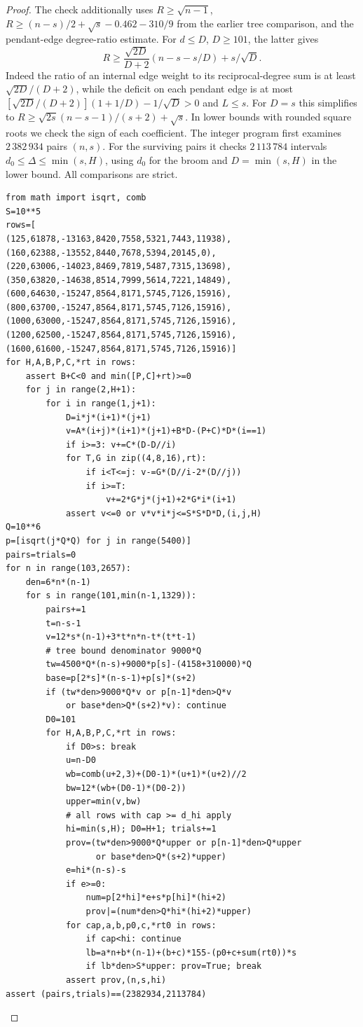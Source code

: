 \documentclass[11pt,a4paper]{article}
\begin{document}
\begin{proof}
The check additionally uses $R\ge\sqrt{n-1}$,
$R\ge(n-s)/2+\sqrt{s}-0.462-310/9$ from the earlier tree comparison,
and the pendant-edge degree-ratio estimate. For $d\le D$, $D\ge101$,
the latter gives
\[
 R\ge\frac{\sqrt{2D}}{D+2}(n-s-s/D)+s/\sqrt D .
\]
Indeed the ratio of an internal edge weight to its reciprocal-degree
sum is at least $\sqrt{2D}/(D+2)$, while the deficit on each pendant
edge is at most $[\sqrt{2D}/(D+2)](1+1/D)-1/\sqrt D>0$ and $L\le s$.
For $D=s$ this simplifies to $R\ge\sqrt{2s}(n-s-1)/(s+2)+\sqrt{s}$.
In lower bounds with rounded square roots we check the sign of each
coefficient. The integer program first examines $2\,382\,934$ pairs
$(n,s)$. For the surviving pairs it checks $2\,113\,784$ intervals
$d_0\le\Delta\le\min(s,H)$, using $d_0$ for the broom and
$D=\min(s,H)$ in the lower bound. All comparisons are strict.
\begin{verbatim}
from math import isqrt, comb
S=10**5
rows=[
(125,61878,-13163,8420,7558,5321,7443,11938),
(160,62388,-13552,8440,7678,5394,20145,0),
(220,63006,-14023,8469,7819,5487,7315,13698),
(350,63820,-14638,8514,7999,5614,7221,14849),
(600,64630,-15247,8564,8171,5745,7126,15916),
(800,63700,-15247,8564,8171,5745,7126,15916),
(1000,63000,-15247,8564,8171,5745,7126,15916),
(1200,62500,-15247,8564,8171,5745,7126,15916),
(1600,61600,-15247,8564,8171,5745,7126,15916)]
for H,A,B,P,C,*rt in rows:
    assert B+C<0 and min([P,C]+rt)>=0
    for j in range(2,H+1):
        for i in range(1,j+1):
            D=i*j*(i+1)*(j+1)
            v=A*(i+j)*(i+1)*(j+1)+B*D-(P+C)*D*(i==1)
            if i>=3: v+=C*(D-D//i)
            for T,G in zip((4,8,16),rt):
                if i<T<=j: v-=G*(D//i-2*(D//j))
                if i>=T:
                    v+=2*G*j*(j+1)+2*G*i*(i+1)
            assert v<=0 or v*v*i*j<=S*S*D*D,(i,j,H)
Q=10**6
p=[isqrt(j*Q*Q) for j in range(5400)]
pairs=trials=0
for n in range(103,2657):
    den=6*n*(n-1)
    for s in range(101,min(n-1,1329)):
        pairs+=1
        t=n-s-1
        v=12*s*(n-1)+3*t*n*n-t*(t*t-1)
        # tree bound denominator 9000*Q
        tw=4500*Q*(n-s)+9000*p[s]-(4158+310000)*Q
        base=p[2*s]*(n-s-1)+p[s]*(s+2)
        if (tw*den>9000*Q*v or p[n-1]*den>Q*v
            or base*den>Q*(s+2)*v): continue
        D0=101
        for H,A,B,P,C,*rt in rows:
            if D0>s: break
            u=n-D0
            wb=comb(u+2,3)+(D0-1)*(u+1)*(u+2)//2
            bw=12*(wb+(D0-1)*(D0-2))
            upper=min(v,bw)
            # all rows with cap >= d_hi apply
            hi=min(s,H); D0=H+1; trials+=1
            prov=(tw*den>9000*Q*upper or p[n-1]*den>Q*upper
                  or base*den>Q*(s+2)*upper)
            e=hi*(n-s)-s
            if e>=0:
                num=p[2*hi]*e+s*p[hi]*(hi+2)
                prov|=(num*den>Q*hi*(hi+2)*upper)
            for cap,a,b,p0,c,*rt0 in rows:
                if cap<hi: continue
                lb=a*n+b*(n-1)+(b+c)*155-(p0+c+sum(rt0))*s
                if lb*den>S*upper: prov=True; break
            assert prov,(n,s,hi)
assert (pairs,trials)==(2382934,2113784)
\end{verbatim}
\end{proof}
\end{document}
